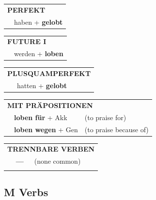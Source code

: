 \documentclass[10pt,a4paper]{revtex4-2}
\begin{document}
\begin{verbbox}
    \vspace{10pt}

 \begin{tabular}{rl}
     \multicolumn{2}{l}{\textbf{PERFEKT}}\\
   & haben + \textbf{gelobt}\\
  \end{tabular}
\hfill
   \begin{tabular}{rl}
    \multicolumn{2}{l}{\textbf{FUTURE I} }\\
   & werden + \textbf{loben}\\
  \end{tabular}
\hfill
   \begin{tabular}{rl}
      \multicolumn{2}{l}{\textbf{PLUSQUAMPERFEKT}}\\
   & hatten + \textbf{gelobt}\\
  \end{tabular}

   \vspace{10pt}

   \begin{tabular}{lll}
      \multicolumn{3}{l}{\textbf{MIT PRÄPOSITIONEN}}\\
& \textbf{loben für} + Akk & (to praise for)\\
& \textbf{loben wegen} + Gen & (to praise because of)\\
\end{tabular}
  \hfill
   \begin{tabular}{lll}
      \multicolumn{3}{l}{\textbf{TRENNBARE VERBEN}}\\
 & \textbf{---} & (none common)\\
\vspace{10pt}
  \end{tabular}

  \vspace{-5pt}

\end{verbbox}


\subsection{M Verbs}
\end{document}
